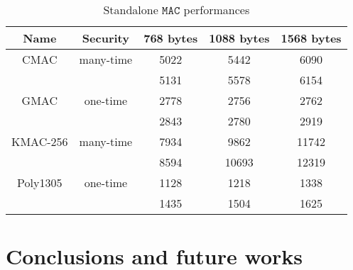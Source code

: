 \documentclass[floatrow,journal=tches,submission]{iacrtrans}
\newcommand{\monospace}{\texttt}
\newcommand{\mac}{\monospace{MAC}}
\begin{document}
\begin{table}[H]
    \centering
    \begin{tabular}{|c|c|c|c|c|}
        \hline
        Name & Security & 768 bytes & 1088 bytes & 1568 bytes \\
        \hline
        CMAC & many-time & 5022 & 5442 & 6090 \\
        & & 5131 & 5578 & 6154 \\
        \hline
        GMAC & one-time & 2778 & 2756 & 2762 \\
        & & 2843 & 2780 & 2919 \\
        \hline
        KMAC-256 & many-time & 7934 & 9862 & 11742 \\
        & & 8594 & 10693 & 12319 \\
        \hline
        Poly1305 & one-time & 1128 & 1218 & 1338 \\
        & & 1435 & 1504 & 1625 \\
        \hline
    \end{tabular}
    \caption{Standalone $\mac$ performances}\label{tbl:standalone-mac-perf}
\end{table}


\section{Conclusions and future works}\label{sec:future-works}



\end{document}
